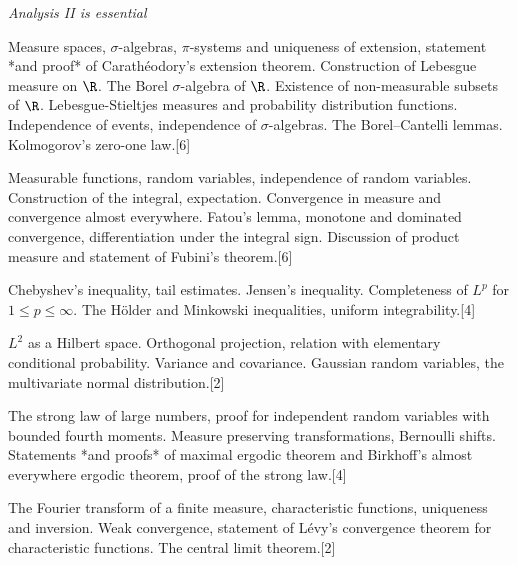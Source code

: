 \documentclass[a4paper]{article}
\begin{document}
\maketitle
{\small
\noindent\emph{Analysis II is essential}
\vspace{10pt}

\noindent Measure spaces, $\sigma$-algebras, $\pi$-systems and uniqueness of extension, statement *and proof* of Carath\'eodory's extension theorem. Construction of Lebesgue measure on $\R$. The Borel $\sigma$-algebra of $\R$. Existence of non-measurable subsets of $\R$. Lebesgue-Stieltjes measures and probability distribution functions. Independence of events, independence of $\sigma$-algebras. The Borel--Cantelli lemmas. Kolmogorov's zero-one law.\hspace*{\fill}[6]

\vspace{5pt}
\noindent Measurable functions, random variables, independence of random variables. Construction of the integral, expectation. Convergence in measure and convergence almost everywhere. Fatou's lemma, monotone and dominated convergence, differentiation under the integral sign. Discussion of product measure and statement of Fubini's theorem.\hspace*{\fill}[6]

\vspace{5pt}
\noindent Chebyshev's inequality, tail estimates. Jensen's inequality. Completeness of $L^p$ for $1 \leq p \leq \infty$. The H\"older and Minkowski inequalities, uniform integrability.\hspace*{\fill}[4]

\vspace{5pt}
\noindent $L^2$ as a Hilbert space. Orthogonal projection, relation with elementary conditional probability. Variance and covariance. Gaussian random variables, the multivariate normal distribution.\hspace*{\fill}[2]

\vspace{5pt}
\noindent The strong law of large numbers, proof for independent random variables with bounded fourth moments. Measure preserving transformations, Bernoulli shifts. Statements *and proofs* of maximal ergodic theorem and Birkhoff's almost everywhere ergodic theorem, proof of the strong law.\hspace*{\fill}[4]

\vspace{5pt}
\noindent The Fourier transform of a finite measure, characteristic functions, uniqueness and inversion. Weak convergence, statement of L\'evy's convergence theorem for characteristic functions. The central limit theorem.\hspace*{\fill}[2]%
}
\end{document}
